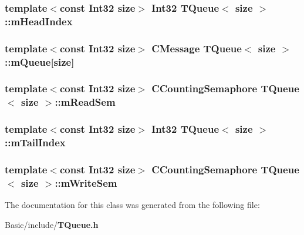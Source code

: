 \subsubsection[{m\-Head\-Index}]{\setlength{\rightskip}{0pt plus 5cm}template$<$const Int32 size$>$ {\bf Int32} {\bf T\-Queue}$<$ size $>$\-::m\-Head\-Index\hspace{0.3cm}{\ttfamily [private]}}\label{classTQueue_ad7d0fc2df56a9dcccdf18d7cdb99278e}
\subsubsection[{m\-Queue}]{\setlength{\rightskip}{0pt plus 5cm}template$<$const Int32 size$>$ {\bf C\-Message} {\bf T\-Queue}$<$ size $>$\-::m\-Queue[size]\hspace{0.3cm}{\ttfamily [private]}}\label{classTQueue_abcbef405103cd05ddb5128aa9ab99041}
\subsubsection[{m\-Read\-Sem}]{\setlength{\rightskip}{0pt plus 5cm}template$<$const Int32 size$>$ {\bf C\-Counting\-Semaphore} {\bf T\-Queue}$<$ size $>$\-::m\-Read\-Sem\hspace{0.3cm}{\ttfamily [private]}}\label{classTQueue_a7ea5a91f0a34c1148f30f942fa64a89a}
\subsubsection[{m\-Tail\-Index}]{\setlength{\rightskip}{0pt plus 5cm}template$<$const Int32 size$>$ {\bf Int32} {\bf T\-Queue}$<$ size $>$\-::m\-Tail\-Index\hspace{0.3cm}{\ttfamily [private]}}\label{classTQueue_a4852689ddce183a0aaa7d6aa0c2d11d9}
\subsubsection[{m\-Write\-Sem}]{\setlength{\rightskip}{0pt plus 5cm}template$<$const Int32 size$>$ {\bf C\-Counting\-Semaphore} {\bf T\-Queue}$<$ size $>$\-::m\-Write\-Sem\hspace{0.3cm}{\ttfamily [private]}}\label{classTQueue_a855f05714b454eb31b3a517f0cb99465}


The documentation for this class was generated from the following file\-:\begin{DoxyCompactItemize}
\item 
Basic/include/{\bf T\-Queue.\-h}\end{DoxyCompactItemize}
